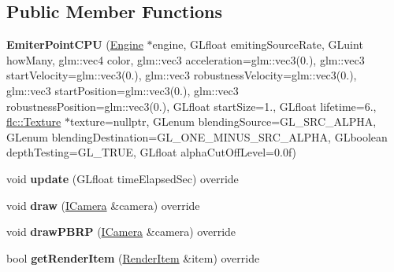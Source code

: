 \subsection*{Public Member Functions}
\begin{DoxyCompactItemize}
\item 
{\bfseries Emiter\+Point\+C\+PU} (\hyperlink{classflw_1_1Engine}{Engine} $\ast$engine, G\+Lfloat emiting\+Source\+Rate, G\+Luint how\+Many, glm\+::vec4 color, glm\+::vec3 acceleration=glm\+::vec3(0.), glm\+::vec3 start\+Velocity=glm\+::vec3(0.), glm\+::vec3 robustness\+Velocity=glm\+::vec3(0.), glm\+::vec3 start\+Position=glm\+::vec3(0.), glm\+::vec3 robustness\+Position=glm\+::vec3(0.), G\+Lfloat start\+Size=1., G\+Lfloat lifetime=6., \hyperlink{classflw_1_1flc_1_1Texture}{flc\+::\+Texture} $\ast$texture=nullptr, G\+Lenum blending\+Source=G\+L\+\_\+\+S\+R\+C\+\_\+\+A\+L\+P\+HA, G\+Lenum blending\+Destination=G\+L\+\_\+\+O\+N\+E\+\_\+\+M\+I\+N\+U\+S\+\_\+\+S\+R\+C\+\_\+\+A\+L\+P\+HA, G\+Lboolean depth\+Testing=G\+L\+\_\+\+T\+R\+UE, G\+Lfloat alpha\+Cut\+Off\+Level=0.\+0f)\hypertarget{classflw_1_1flf_1_1EmiterPointCPU_a85fabd562bea67577072b4490ee07579}{}\label{classflw_1_1flf_1_1EmiterPointCPU_a85fabd562bea67577072b4490ee07579}

\item 
void {\bfseries update} (G\+Lfloat time\+Elapsed\+Sec) override\hypertarget{classflw_1_1flf_1_1EmiterPointCPU_a39dc08138d5366e98360db1e40e5f3df}{}\label{classflw_1_1flf_1_1EmiterPointCPU_a39dc08138d5366e98360db1e40e5f3df}

\item 
void {\bfseries draw} (\hyperlink{classflw_1_1flf_1_1ICamera}{I\+Camera} \&camera) override\hypertarget{classflw_1_1flf_1_1EmiterPointCPU_ad17e8a7d32a32e795be9d071acca15f6}{}\label{classflw_1_1flf_1_1EmiterPointCPU_ad17e8a7d32a32e795be9d071acca15f6}

\item 
void {\bfseries draw\+P\+B\+RP} (\hyperlink{classflw_1_1flf_1_1ICamera}{I\+Camera} \&camera) override\hypertarget{classflw_1_1flf_1_1EmiterPointCPU_ac910a2c531211f991146a7ee566b3c6e}{}\label{classflw_1_1flf_1_1EmiterPointCPU_ac910a2c531211f991146a7ee566b3c6e}

\item 
bool {\bfseries get\+Render\+Item} (\hyperlink{structflw_1_1flf_1_1RenderItem}{Render\+Item} \&item) override\hypertarget{classflw_1_1flf_1_1EmiterPointCPU_a52c18a5d5a4d36cfb2b07f6f1355be80}{}\label{classflw_1_1flf_1_1EmiterPointCPU_a52c18a5d5a4d36cfb2b07f6f1355be80}

\end{DoxyCompactItemize}
